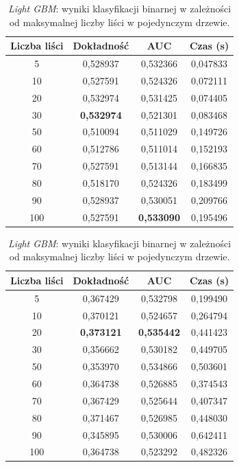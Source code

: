 \documentclass[a4paper, twoside, 11pt, openright]{article}
\begin{document}
\begin{table}[H]
    \centering
    \begin{tabular}{|c|c|c|c|}
    \hline
        \textbf{Liczba liści} & \textbf{Dokładność} & \textbf{AUC} & \textbf{Czas (s)} \\ \hline
5        &  0,528937 &  0,532366 &    0,047833 \\ \hline
10       &  0,527591 &  0,524326 &    0,072111 \\ \hline
20       &  0,532974 &  0,531425 &    0,074405 \\ \hline
30       &  \textbf{0,532974} &  0,521301 &    0,083468 \\ \hline
50       &  0,510094 &  0,511029 &    0,149726 \\ \hline
60       &  0,512786 &  0,511014 &    0,152193 \\ \hline
70       &  0,527591 &  0,513144 &    0,166835 \\ \hline
80       &  0,518170 &  0,524326 &    0,183499 \\ \hline
90       &  0,528937 &  0,530051 &    0,209766 \\ \hline
100      &  0,527591 &  \textbf{0,533090} &    0,195496 \\ \hline
    \end{tabular}
    \caption{\textit{Light GBM}: wyniki klasyfikacji binarnej w zależności od maksymalnej liczby liści w pojedynczym drzewie.}
    \label{tab:lgbm_num_leaves_binary}
\end{table}

\begin{table}[H]
    \centering
    \begin{tabular}{|c|c|c|c|}
    \hline
        \textbf{Liczba liści} & \textbf{Dokładność} & \textbf{AUC} & \textbf{Czas (s)} \\ \hline
5        &  0,367429 &  0,532798 &    0,199490 \\ \hline
10       &  0,370121 &  0,524657 &    0,264794 \\ \hline
20       &  \textbf{0,373121} &  \textbf{0,535442} &    0,441423 \\ \hline
30       &  0,356662 &  0,530182 &    0,449705 \\ \hline
50       &  0,353970 &  0,534866 &    0,503601 \\ \hline
60       &  0,364738 &  0,526885 &    0,374543 \\ \hline
70       &  0,367429 &  0,525644 &    0,407347 \\ \hline
80       &  0,371467 &  0,526985 &    0,448030 \\ \hline
90       &  0,345895 &  0,530006 &    0,642411 \\ \hline
100      &  0,364738 &  0,523292 &    0,482326 \\ \hline

    \end{tabular}
    \caption{\textit{Light GBM}: wyniki klasyfikacji binarnej w zależności od maksymalnej liczby liści w pojedynczym drzewie.}
    \label{tab:lgbm_num_leaves_discrete}
\end{table}
\end{document}
